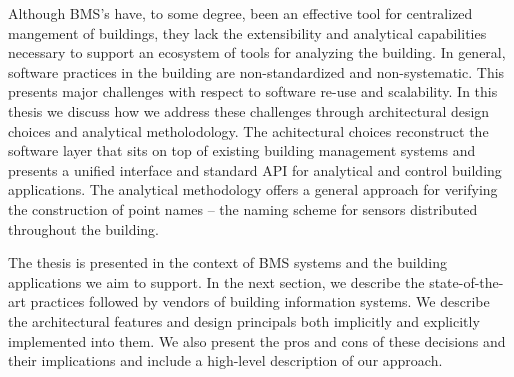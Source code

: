 Although BMS's have, to some degree, been an effective tool for centralized mangement of buildings, they lack the extensibility
and analytical capabilities necessary to support an ecosystem of tools for analyzing the building.  In general, software
practices in the building are non-standardized and non-systematic.
This presents major challenges with respect to software re-use and scalability.  
In this thesis we discuss how we address these challenges through architectural design choices and analytical metholodology.  
The achitectural choices reconstruct the software layer that sits on top of existing building management systems and presents
a unified interface and standard API for analytical and control building applications.
The analytical methodology offers a general approach for verifying the construction of point names -- the naming scheme for 
sensors distributed throughout the building.  

The thesis is presented in the context of BMS systems and the building applications we aim to support.
In the next section, we describe the state-of-the-art practices followed by vendors of building information systems.
We describe the architectural features and design principals both implicitly and explicitly implemented into them.
We also present the pros and cons of these decisions and their implications and include a high-level description of our approach.







